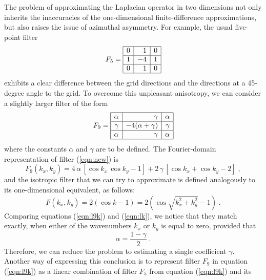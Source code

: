 The problem of approximating the Laplacian operator in two dimensions
not only inherits the inaccuracies of the one-dimensional
finite-difference approximations, but also raises the issue of
azimuthal asymmetry. For example, the usual five-point filter
\begin{equation}
\label{eqn:usual}
F_5 =
\begin{array}{|r|r|r|}
\hline
0 & 1 & 0 \\ \hline
1 & -4 & 1 \\ \hline
0 & 1 & 0  \\ \hline 
\end{array}
\end{equation}
exhibits a clear difference between the grid directions and the
directions at a 45-degree angle to the grid. To overcome this
unpleasant anisotropy, we can consider a slightly larger filter of the
form
\begin{equation}
\label{eqn:new}
F_9 = \begin{array}{|r|r|r|}
\hline
\alpha & \gamma & \alpha \\ \hline
\gamma & -4 (\alpha+\gamma) & \gamma \\ \hline
\alpha & \gamma & \alpha  \\ \hline 
\end{array}
\end{equation}
where the constants $\alpha$ and $\gamma$ are to be defined. The
Fourier-domain representation of filter (\ref{eqn:new}) is
\begin{equation}
  \label{eqn:l9k}
  F_9 (k_x,k_y) = 4\,\alpha\,[\cos{k_x}\,\cos{k_y} - 1] +
  2\,\gamma\,[\cos{k_x}+\cos{k_y}-2]\;,
\end{equation}
and the isotropic filter that we can try to approximate is defined
analogously to its one-dimensional equivalent, as follows:
\begin{equation}
  \label{eqn:lk}
  F (k_x,k_y) = 2 (\cos{k} -1) = 2 (\cos{\sqrt{k_x^2+k_y^2}} - 1)\;.
\end{equation}
Comparing equations (\ref{eqn:l9k}) and (\ref{eqn:lk}), we notice that
they match exactly, when either of the wavenumbers $k_x$ or $k_y$ is
equal to zero, provided that 
\begin{equation}
  \label{eqn:alpha}
  \alpha = \frac{1-\gamma}{2}\;.
\end{equation}
Therefore, we can reduce the problem to estimating a single
coefficient $\gamma$. Another way of expressing this conclusion is to
represent filter $F_9$ in equation (\ref{eqn:l9k}) as a linear
combination of filter $F_5$ from equation (\ref{eqn:l9k}) and its
